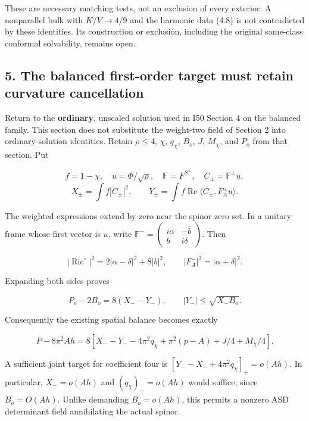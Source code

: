 \documentclass[
  10pt,
]{article}
\begin{document}
These are necessary matching tests, not an exclusion of every exterior.
A nonparallel bulk with \(K/V\to4/9\) and the harmonic data (4.8) is not
contradicted by these identities. Its construction or exclusion,
including the original same-class conformal solvability, remains open.

\hypertarget{the-balanced-first-order-target-must-retain-curvature-cancellation}{%
\subsection{5. The balanced first-order target must retain curvature
cancellation}\label{the-balanced-first-order-target-must-retain-curvature-cancellation}}

Return to the \textbf{ordinary}, unscaled solution used in I50 Section 4
on the balanced family. This section does not substitute the weight-two
field of Section 2 into ordinary-solution identities. Retain
\(\rho\le4\), \(\chi\), \(q_\chi\), \(B_o\), \(J\), \(M_\chi\), and
\(P_o\) from that section. Put

\[
 f=1-\chi,\quad u=\Phi/\sqrt\rho,\quad
 \mathbb F=F^{S^+},\quad C_\pm=\mathbb F^\pm u,
\] \[
 X_\pm=\int f|C_\pm|^2,\qquad
 Y_\pm=\int f\operatorname{Re}\langle C_\pm,F_A^\pm u\rangle.
 \tag{5.1}
\]

The weighted expressions extend by zero near the spinor zero set. In a
unitary frame whose first vector is \(u\), write
\(\mathbb F^-=\left(\begin{smallmatrix}i\alpha&-\overline b\\ b&i\delta\end{smallmatrix}\right)\).
Then

\[
 |\operatorname{Ric}^{\circ}|^2
 =2|\alpha-\delta|^2+8|b|^2,\qquad
 |F_A^-|^2=|\alpha+\delta|^2.
\]

Expanding both sides proves

\[
 \boxed{P_o-2B_o=8(X_--Y_-),\qquad
 |Y_-|\le\sqrt{X_-B_o}.}
 \tag{5.2}
\]

Consequently the existing spatial balance becomes exactly

\[
 P-8\pi^2Ah=8\left[X_--Y_--4\pi^2q_\chi+
             \pi^2(p-A)+J/4+M_\chi/4\right].
 \tag{5.3}
\]

A sufficient joint target for coefficient four is
\([Y_--X_-+4\pi^2q_\chi]_+=o(Ah)\). In particular, \(X_-=o(Ah)\) and
\((q_\chi)_+=o(Ah)\) would suffice, since \(B_o=O(Ah)\). Unlike
demanding \(B_o=o(Ah)\), this permits a nonzero ASD determinant field
annihilating the actual spinor.
\end{document}
